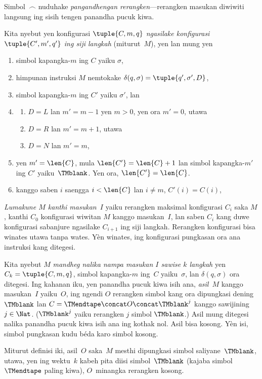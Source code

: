 \documentclass[../../../include/open-logic-section]{subfiles}
\begin{document}
\begin{explain}
%
 Simbol~$\frown$ nuduhake \emph{pangandhengan
rerangken}---rerangken masukan diwiwiti langsung
ing sisih tengen panandha pucuk kiwa.
\end{explain}

\begin{defn}
Kita nyebut yen konfigurasi $\tuple{C, m, q}$
\emph{ngasilake konfigurasi $\tuple{C', m', q'}$
ing siji langkah} (miturut~$M$), yen lan mung yen
\begin{enumerate}
\item simbol kapangka-$m$ ing $C$ yaiku $\sigma$,
\item himpunan instruksi $M$ nemtokake $\delta(q, \sigma) =
  \tuple{q', \sigma', D}$,
\item simbol kapangka-$m$ ing $C'$ yaiku $\sigma'$, lan
\item
\begin{enumerate}
\item $D = L$ lan $m' = m - 1$ yen $m>0$, yen ora $m'=0$, utawa
\item $D = R$ lan $m' = m + 1$, utawa
\item $D = N$ lan $m' = m$,
\end{enumerate}
\item yen $m' = \len{C}$, mula $\len{C'} = \len{C} + 1$ lan simbol
  kapangka-$m'$ ing $C'$ yaiku~$\TMblank$. Yen ora, $\len{C'}=\len{C}$.
\item kanggo saben $i$ saengga $i < \len{C}$ lan $i \neq m$, $C'(i) = C(i)$,
\end{enumerate}
\end{defn}

\begin{defn}
\emph{Lumakune $M$ kanthi masukan~$I$}
yaiku rerangken maksimal konfigurasi $C_i$ saka $M$,
kanthi $C_0$ konfigurasi wiwitan $M$
kanggo masukan~$I$, lan saben $C_i$ kang duwe konfigurasi sabanjure
ngasilake $C_{i+1}$ ing siji langkah. Rerangken konfigurasi bisa winates utawa tanpa wates. Yèn winates, ing konfigurasi pungkasan ora ana instruksi kang ditegesi.

Kita nyebut $M$ \emph{mandheg nalika nampa masukan $I$
sawise $k$ langkah} yen $C_k =
\tuple{C, m, q}$, simbol kapangka-$m$
ing~$C$ yaiku~$\sigma$, lan $\delta(q,
\sigma)$ ora ditegesi. Ing kahanan iku, yen panandha pucuk kiwa isih ana,
\emph{asil}~$M$ kanggo masukan~$I$ yaiku~$O$,
ing ngendi $O$ rerangken simbol kang ora dipungkasi
dening~$\TMblank$ lan $C = \TMendtape \concat O \concat \TMblank^j$
kanggo sawijining~$j \in \Nat$. ($\TMblank^j$
yaiku rerangken $j$ simbol $\TMblank$.)
Asil mung ditegesi nalika panandha pucuk kiwa isih ana ing kothak nol. Asil bisa kosong. Yèn isi, simbol pungkasan kudu béda karo simbol kosong. \end{defn}

\begin{explain}
Miturut definisi iki, asil~$O$ saka~$M$
mesthi dipungkasi simbol saliyane~$\TMblank$,
utawa, yen ing wektu~$k$ kabeh pita diisi
simbol~$\TMblank$ (kajaba simbol~$\TMendtape$
paling kiwa), $O$~minangka rerangken kosong.
\end{explain}
\end{document}
